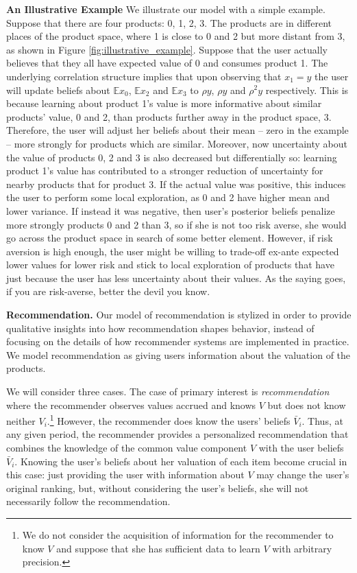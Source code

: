 \documentclass[sigconf]{acmart}
\begin{document}
\noindent \textbf{An Illustrative Example} We illustrate our model with a simple example. Suppose that there are four products: 0, 1, 2, 3. The products are in different places of the product space, where 1 is close to 0 and 2 but more distant from 3, as shown in Figure \ref{fig:illustrative_example}.
Suppose that the user actually believes that they all have expected value of 0 and consumes product 1. The underlying correlation structure implies that upon observing that $x_1=y$ the user will update beliefs about $\mathbb E x_0$, $\mathbb E x_2$ and $\mathbb E x_3$ to $\rho y$, $\rho y$ and $\rho^2 y$ respectively. This is because learning about product 1's value is more informative about similar products' value, 0 and 2, than products further away in the product space, 3. Therefore, the user will adjust her beliefs about their mean -- zero in the example -- more strongly for products which are similar. Moreover, now uncertainty about the value of products 0, 2 and 3 is also decreased but differentially so: learning product 1's value has contributed to a stronger reduction of uncertainty for nearby products that for product 3. If the actual value was positive, this induces the user to perform some local exploration, as 0 and 2 have higher mean and lower variance. If instead it was negative, then user's posterior beliefs penalize more strongly products 0 and 2 than 3, so if she is not too risk averse, she would go across the product space in search of some better element. However, if risk aversion is high enough, the user might be willing to trade-off ex-ante expected lower values for lower risk and stick to local exploration of products that have just because the user has less uncertainty about their values. As the saying goes, if you are risk-averse, better the devil you know.
\par

\noindent \textbf{Recommendation.}
Our model of recommendation is stylized in order to provide qualitative insights into how recommendation shapes behavior, instead of focusing on the details of how recommender systems are implemented in practice. We model recommendation as giving users information about the valuation of the products.
\par

We will consider three cases. The case of primary interest is \textit{recommendation} where the recommender observes values accrued and knows $V$ but does not know neither $V_i$.\footnote{We do not consider the acquisition of information for the recommender to know $V$ and suppose that she has sufficient data to learn $V$ with arbitrary precision.} However, the recommender does know the users' beliefs $\bar V_i$. Thus, at any given period, the recommender provides a personalized recommendation that combines the knowledge of the common value component $V$ with the user beliefs $\bar V_i$. Knowing the user's beliefs about her valuation of each item become crucial in this case: just providing the user with information about $V$ may change the user's original ranking, but, without considering the user's beliefs, she will not necessarily follow the recommendation.
\par
\end{document}
